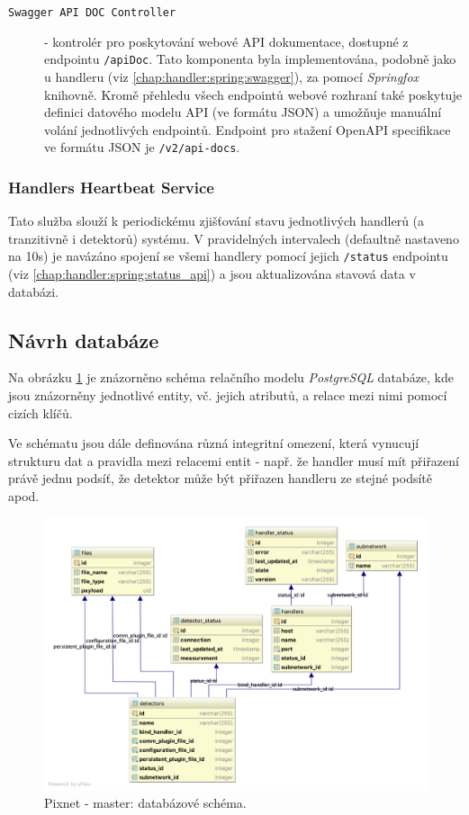 \begin{description}
    \item[\texttt{Swagger API DOC Controller}] - kontrolér pro poskytování webové API dokumentace, dostupné z endpointu \texttt{/apiDoc}. Tato komponenta byla implementována, podobně jako u handleru (viz \ref{chap:handler:spring:swagger}), za pomocí \textit{Springfox} \cite{springfox} knihovně. Kromě přehledu všech endpointů webové rozhraní také poskytuje definici datového modelu API (ve formátu JSON) a umožňuje manuální volání jednotlivých endpointů. Endpoint pro stažení OpenAPI specifikace ve formátu JSON je \texttt{/v2/api-docs}.
\end{description}

\subsubsection{Handlers Heartbeat Service}
Tato služba slouží k periodickému zjišťování stavu jednotlivých handlerů (a tranzitivně i detektorů) systému. V pravidelných intervalech (defaultně nastaveno na \unit{10}{s}) je navázáno spojení se všemi handlery pomocí jejich \texttt{/status} endpointu (viz \ref{chap:handler:spring:status_api}) a jsou aktualizována stavová data v databázi.

\subsection{Návrh databáze}\label{chap:master:backend:db}
Na obrázku \ref{fig:master:db_schema} je znázorněno schéma relačního modelu \textit{PostgreSQL} databáze, kde jsou znázorněny jednotlivé entity, vč. jejich atributů, a relace mezi nimi pomocí cizích klíčů.

Ve schématu jsou dále definována různá integritní omezení, která vynucují strukturu dat a pravidla mezi relacemi entit - např. že handler musí mít přiřazení právě jednu podsíť, že detektor může být přiřazen handleru ze stejné podsítě apod.

\begin{figure}[h]
	\begin{center}
		\vspace*{0.4cm}
		\includegraphics[width=15cm]{figures/master_db.png}
		\caption{Pixnet - master: databázové schéma.}
		\label{fig:master:db_schema}
	\end{center}
\end{figure}

